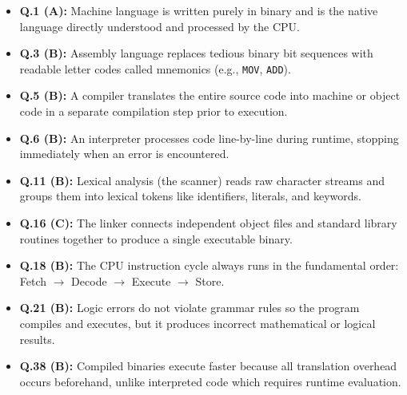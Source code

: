 \begin{expbox}
\begin{itemize}[leftmargin=5mm]
    \item \textbf{Q.1 (A):} Machine language is written purely in binary and is the native language directly understood and processed by the CPU.
    \item \textbf{Q.3 (B):} Assembly language replaces tedious binary bit sequences with readable letter codes called mnemonics (e.g., \texttt{MOV}, \texttt{ADD}).
    \item \textbf{Q.5 (B):} A compiler translates the entire source code into machine or object code in a separate compilation step prior to execution.
    \item \textbf{Q.6 (B):} An interpreter processes code line-by-line during runtime, stopping immediately when an error is encountered.
    \item \textbf{Q.11 (B):} Lexical analysis (the scanner) reads raw character streams and groups them into lexical tokens like identifiers, literals, and keywords.
    \item \textbf{Q.16 (C):} The linker connects independent object files and standard library routines together to produce a single executable binary.
    \item \textbf{Q.18 (B):} The CPU instruction cycle always runs in the fundamental order: Fetch $\rightarrow$ Decode $\rightarrow$ Execute $\rightarrow$ Store.
    \item \textbf{Q.21 (B):} Logic errors do not violate grammar rules so the program compiles and executes, but it produces incorrect mathematical or logical results.
    \item \textbf{Q.38 (B):} Compiled binaries execute faster because all translation overhead occurs beforehand, unlike interpreted code which requires runtime evaluation.
\end{itemize}
\end{expbox}

\newpage
